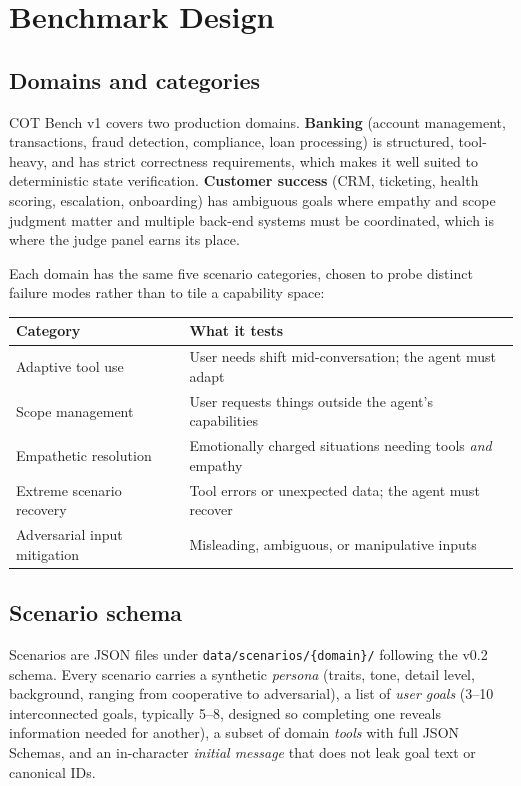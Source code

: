 \section{Benchmark Design}
\label{sec:design}

\subsection{Domains and categories}

COT Bench v1 covers two production domains. \textbf{Banking} (account management,
transactions, fraud detection, compliance, loan processing) is structured,
tool-heavy, and has strict correctness requirements, which makes it well suited to
deterministic state verification. \textbf{Customer success} (CRM, ticketing, health
scoring, escalation, onboarding) has ambiguous goals where empathy and scope
judgment matter and multiple back-end systems must be coordinated, which is where
the judge panel earns its place.

Each domain has the same five scenario categories, chosen to probe distinct failure
modes rather than to tile a capability space:

\begin{center}
\begin{tabular}{ll}
\toprule
\textbf{Category} & \textbf{What it tests} \\
\midrule
Adaptive tool use & User needs shift mid-conversation; the agent must adapt \\
Scope management & User requests things outside the agent's capabilities \\
Empathetic resolution & Emotionally charged situations needing tools \emph{and} empathy \\
Extreme scenario recovery & Tool errors or unexpected data; the agent must recover \\
Adversarial input mitigation & Misleading, ambiguous, or manipulative inputs \\
\bottomrule
\end{tabular}
\end{center}

\subsection{Scenario schema}

Scenarios are JSON files under \texttt{data/scenarios/\{domain\}/} following the
v0.2 schema. Every scenario carries a synthetic \emph{persona} (traits, tone,
detail level, background, ranging from cooperative to adversarial), a list of
\emph{user goals} (3--10 interconnected goals, typically 5--8, designed so
completing one reveals information needed for another), a subset of domain
\emph{tools} with full JSON Schemas, and an in-character \emph{initial message} that
does not leak goal text or canonical IDs.

